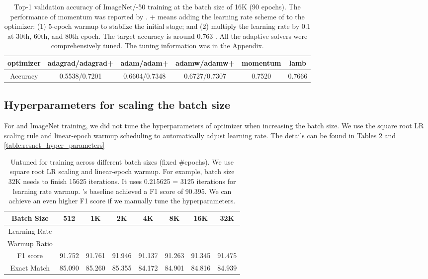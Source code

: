\documentclass{article} \usepackage{iclr2020_conference,times}
\begin{document}
\begin{table}[ht]
\renewcommand{\arraystretch}{1.3}
\caption{ Top-1 validation accuracy of ImageNet/-50 training at the batch size of 16K (90 epochs). The performance of momentum was reported by \citep{goyal2017accurate}. + means adding the learning rate scheme of \cite{goyal2017accurate} to the optimizer: (1) 5-epoch warmup to stablize the initial stage; and (2) multiply the learning rate by 0.1 at 30th, 60th, and 80th epoch. The target accuracy is around 0.763 \citep{goyal2017accurate}. All the adaptive solvers were comprehensively tuned. The tuning information was in the Appendix.}
\centering

\begin{tabular}{|c|c|c|c|c|c|}
\hline
optimizer & adagrad/adagrad+ & adam/adam+ & adamw/adamw+ & momentum & lamb \\
\hline
\hline
Accuracy & 0.5538/0.7201 & 0.6604/0.7348 & 0.6727/0.7307 & 0.7520 & 0.7666  \\
\hline
\end{tabular}
\label{table:resnet50_acc}
\end{table}

\subsection{Hyperparameters for scaling the batch size}
For  and ImageNet training, we did not tune the hyperparameters of  optimizer when increasing the batch size. We use the square root LR scaling rule and linear-epoch warmup scheduling to automatically adjust learning rate. The details can be found in Tables \ref{table:hyper_parameters} and \ref{table:resnet_hyper_parameters}

\begin{table}[ht]
\renewcommand{\arraystretch}{1.3}
\caption{Untuned  for  training across different batch sizes (fixed \#epochs). We use square root LR scaling and linear-epoch warmup. For example, batch size 32K needs to finish 15625 iterations. It uses 0.215625 = 3125 iterations for learning rate warmup. 's baseline achieved a F1 score of 90.395. We can achieve an even higher F1 score if we manually tune the hyperparameters.}

\centering
\begin{tabular}{|c|c|c|c|c|c|c|c|}
\hline
Batch Size & 512 & 1K & 2K & 4K & 8K & 16K & 32K\\
\hline
\hline
Learning Rate &  &  &  &  &  &  & \\
\hline
Warmup Ratio &  &  &  &  &  &  & \\
\hline
F1 score & 91.752 & 91.761 & 91.946 & 91.137 & 91.263 & 91.345 & 91.475 \\
\hline
Exact Match & 85.090 & 85.260 & 85.355 & 84.172 & 84.901 & 84.816 & 84.939 \\
\hline
\end{tabular}
\label{table:hyper_parameters}
\end{table}
\end{document}
